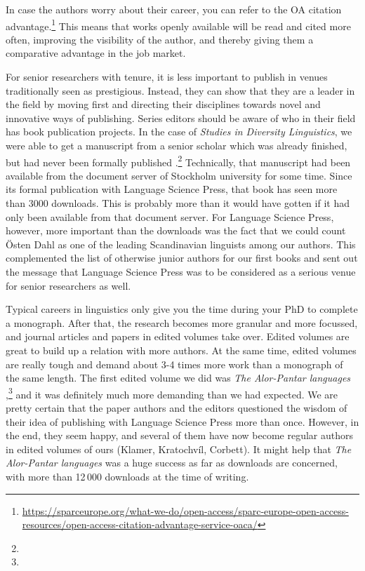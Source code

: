 \documentclass[nonflat,smallfont
]{langsci/langscibook}
\begin{document}
In case the authors worry about their career, you can refer to the OA citation advantage.\footnote{\url{https://sparceurope.org/what-we-do/open-access/sparc-europe-open-access-resources/open-access-citation-advantage-service-oaca/}} This means that works openly available will be read and cited more often, improving the visibility of the author, and thereby giving them a comparative advantage in the job market.

For senior researchers with tenure, it is less important to publish in venues traditionally seen as prestigious. Instead, they can show that they are a leader in the field by moving first and directing their disciplines towards novel and innovative ways of publishing. 
Series editors should be aware of who in their field has book publication projects. In the case of \textit{Studies in Diversity Linguistics}, we were able to get a manuscript from a senior scholar which was already finished, but had never been formally published \citep{Dahl2016}.\footnote{} Technically, that manuscript had been available from the document server of Stockholm university for some time. Since its formal publication with Language Science Press, that book has seen more than 3000 downloads. This is probably more than it would have gotten if it had only been available from that document server. For Language Science Press, however, more important than the downloads  was the fact that we could count Östen Dahl as one of the leading Scandinavian linguists among our authors. This complemented the list of otherwise junior authors for our first books and sent out the message that Language Science Press was to be considered as a serious venue for senior researchers as well. 

Typical careers in linguistics only give you the time during your PhD to complete a monograph. After that, the research becomes more granular and more focussed, and journal articles and papers in edited volumes take over. Edited volumes are great to build up a relation with more authors. At the same time, edited volumes are really tough and demand about 3-4 times more work than a monograph of the same length. The first edited volume we did was \textit{The Alor-Pantar languages} \citep{Klamer2014},\footnote{} and it was definitely much more demanding than we had expected. We are pretty certain that the paper authors and the editors questioned the wisdom of their idea of publishing with Language Science Press more than once. However, in the end, they seem happy, and several of them have now become regular authors in edited volumes of ours (Klamer, Kratochvíl, Corbett). It might help that \textit{The Alor-Pantar languages} was a huge success as far as downloads are concerned, with more than 12\,000 downloads at the time of writing. 
\end{document}
